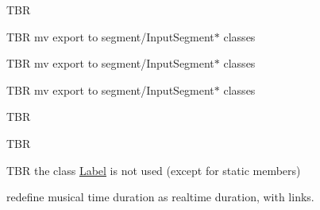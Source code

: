 \begin{DoxyRefList}
\label{todo__todo000023}%
%
T\+BR  
\item[Member \mbox{\hyperlink{classInputSegmentMIDI_a936c91d6d4d71d1e968808064455e9d4}{Input\+Segment\+M\+I\+DI::export\+\_\+midifile}} (std\+::string, \mbox{\hyperlink{classRational}{Rational}})]\label{todo__todo000003}%
%
T\+BR mv export to segment/\+Input\+Segment$\ast$ classes  
\item[Member \mbox{\hyperlink{classInputSegmentMIDI_a6c0b140ef054db3d0669ffbb11c8c29b}{Input\+Segment\+M\+I\+DI::export\+\_\+midifile}} (Midi\+File \&midifile, std\+::string midiout, \mbox{\hyperlink{classRational}{Rational}} beatperbar)]\label{todo__todo000004}%
%
T\+BR mv export to segment/\+Input\+Segment$\ast$ classes  
\item[Member \mbox{\hyperlink{classInputSegmentMIDI_af2ac856f11e5ebbca039e988e0df0d9d}{Input\+Segment\+M\+I\+DI::export\+\_\+midifile\+\_\+mono}} (Midi\+File \&midifile, std\+::string midiout, \mbox{\hyperlink{classRational}{Rational}} beatperbar)]\label{todo__todo000005}%
%
T\+BR mv export to segment/\+Input\+Segment$\ast$ classes  
\item[Member \mbox{\hyperlink{classInputSegmentMIDI_a97c065fd510e9a925e12e44b6378f394}{Input\+Segment\+M\+I\+DI::Input\+Segment\+M\+I\+DI}} (const std\+::string filename, bool mono=true, bool norest=false, int tracknb=1)]\label{todo__todo000002}%
%
T\+BR  
\item[Class \mbox{\hyperlink{structIntervalHasher}{Interval\+Hasher}} ]\label{todo__todo000025}%
%
T\+BR  
\item[Class \mbox{\hyperlink{classLabel}{Label}} ]\label{todo__todo000012}%
%
T\+BR the class \mbox{\hyperlink{classLabel}{Label}} is not used (except for static members)  
\item[Class \mbox{\hyperlink{classMusPoint}{Mus\+Point}} ]\label{todo__todo000026}%
%
redefine musical time duration as realtime duration, with links. 


\end{DoxyRefList}
